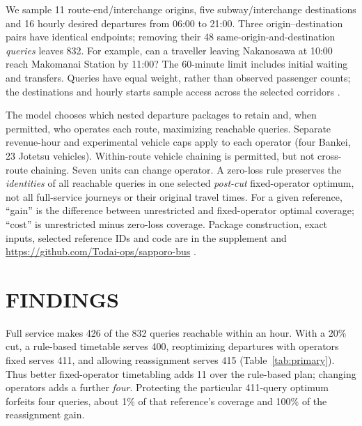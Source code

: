 \documentclass[11pt]{article}
\begin{document}
We sample 11 route-end/interchange origins, five subway/interchange destinations and 16 hourly desired departures from 06:00 to 21:00. Three origin--destination pairs have identical endpoints; removing their 48 same-origin-and-destination \emph{queries} leaves 832. For example, can a traveller leaving Nakanosawa at 10:00 reach Makomanai Station by 11:00? The 60-minute limit includes initial waiting and transfers. Queries have equal weight, rather than observed passenger counts; the destinations and hourly starts sample access across the selected corridors \citep{geurs2004,farber2014}.

The model chooses which nested departure packages to retain and, when permitted, who operates each route, maximizing reachable queries. Separate revenue-hour and experimental vehicle caps apply to each operator (four Bankei, 23 Jotetsu vehicles). Within-route vehicle chaining is permitted, but not cross-route chaining. Seven units can change operator. A zero-loss rule preserves the \emph{identities} of all reachable queries in one selected \emph{post-cut} fixed-operator optimum, not all full-service journeys or their original travel times. For a given reference, ``gain'' is the difference between unrestricted and fixed-operator optimal coverage; ``cost'' is unrestricted minus zero-loss coverage. Package construction, exact inputs, selected reference IDs and code are in the supplement and \url{https://github.com/Todai-ops/sapporo-bus} \citep{sharma2026sapporoRepo}.

\section{FINDINGS}
Full service makes 426 of the 832 queries reachable within an hour. With a 20\% cut, a rule-based timetable serves 400, reoptimizing departures with operators fixed serves 411, and allowing reassignment serves 415 (Table~\ref{tab:primary}). Thus better fixed-operator timetabling adds 11 over the rule-based plan; changing operators adds a further \emph{four}. Protecting the particular 411-query optimum forfeits four queries, about 1\% of that reference's coverage and 100\% of the reassignment gain.

\begin{table}[H]
\centering
\caption{Primary 60-minute results, offset zero (reachable queries of 832). ``Keep reference'' preserves each query reachable under the selected post-cut fixed-operator optimum.}
\label{tab:primary}
\small
{}
\end{table}
\end{document}
